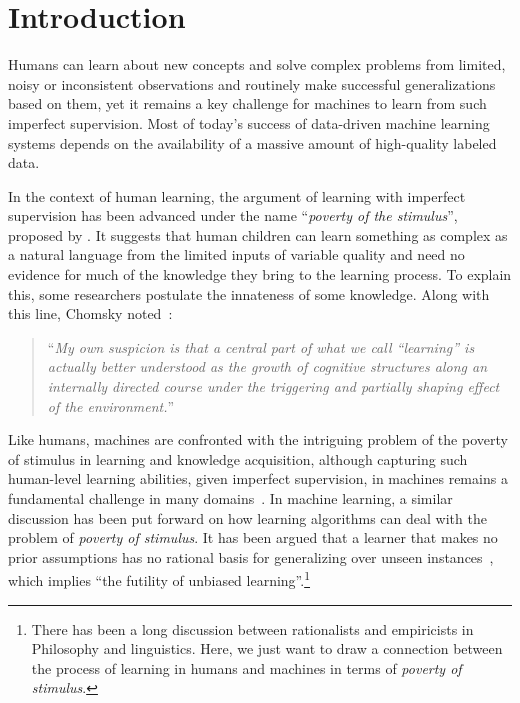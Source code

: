 \chapter{Introduction}
Humans can learn about new concepts and solve complex problems from limited, noisy or inconsistent observations and routinely make successful generalizations based on them, yet it remains a key challenge for machines to learn from such imperfect supervision. Most of today's success of data-driven machine learning systems depends on the availability of a massive amount of high-quality labeled data.

In the context of human learning, the argument of learning with imperfect supervision has been advanced under the name ``\emph{poverty of the stimulus}'', proposed by \citet{chomsky1980rules}. It suggests that human children can learn something as complex as a natural language from the limited inputs of variable quality and need no evidence for much of the knowledge they bring to the learning process. 
To explain this, some researchers postulate the innateness of some knowledge.
Along with this line, Chomsky noted~\citep{chomsky1980rules}:
\begin{quote}
    ``\emph{My own suspicion is that a central part of what we call “learning” is actually better understood as the growth of cognitive structures along an internally directed course under the triggering and partially shaping effect of the environment.}''
\end{quote}

Like humans, machines are confronted with the intriguing problem of the poverty of stimulus in learning and knowledge acquisition, although capturing such human-level learning abilities, given imperfect supervision, in machines remains a fundamental challenge in many domains~\citep{lake2017building}. 
%
In machine learning, a similar discussion has been put forward on how learning algorithms can deal with the problem of \emph{poverty of stimulus}. It has been argued that a learner that makes no prior assumptions has no rational basis for generalizing over unseen instances~\citep{Mitchell:1997:ML}, which implies ``the futility of unbiased learning''.\footnote{There has been a long discussion between rationalists and empiricists in Philosophy and linguistics. Here, we just want to draw a connection between the process of learning in humans and machines in terms of \emph{poverty of stimulus}.}


